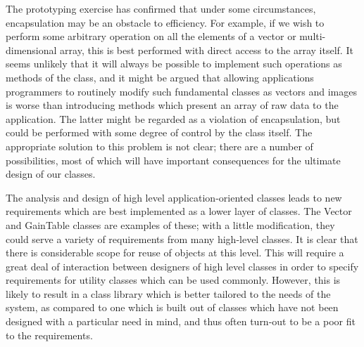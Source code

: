 The prototyping exercise has confirmed that under some circumstances,
encapsulation may be an obstacle to efficiency.  For example, if we
wish to perform some arbitrary operation on all the elements of a
vector or multi-dimensional array, this is best performed with direct
access to the array itself.  It seems unlikely that it will always be
possible to implement such operations as methods of the class, and it
might be argued that allowing applications programmers to routinely
modify such fundamental classes as vectors and images is worse than
introducing methods which present an array of raw data to the
application.  The latter might be regarded as a violation of
encapsulation, but could be performed with some degree of control by
the class itself.  The appropriate solution to this problem is not
clear; there are a number of possibilities, most of which will have
important consequences for the ultimate design of our classes.

The analysis and design of high level application-oriented classes
leads to new requirements which are best implemented as a lower layer
of classes.  The Vector and GainTable classes are examples of these;
with a little modification, they could serve a variety of requirements
from many high-level classes.  It is clear that there is considerable
scope for reuse of objects at this level.  This will require a great
deal of interaction between designers of high level classes in order
to specify requirements for utility classes which can be used
commonly.  However, this is likely to result in a class library which
is better tailored to the needs of the system, as compared to one
which is built out of classes which have not been designed with a
particular need in mind, and thus often turn-out to be a poor fit to
the requirements.

